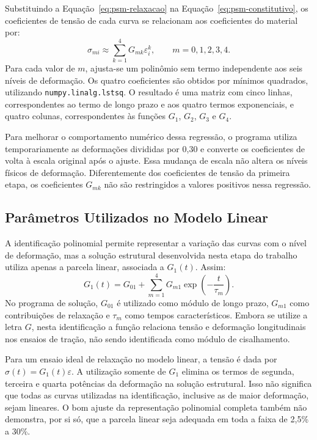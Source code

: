 \documentclass[arial,centeredequations,english,brazilian,oneside,section=TITLE]{ifes8}
\begin{document}
Substituindo a Equação~\eqref{eq:psm-relaxacao} na
Equação~\eqref{eq:psm-constitutivo}, os coeficientes de tensão de cada curva se relacionam
aos coeficientes do material por:
\begin{equation}
  \label{eq:regressao-coeficientes-material}
  \sigma_{mi}\approx\sum_{k=1}^{4}G_{mk}\varepsilon_i^k,
  \qquad m=0,1,2,3,4.
\end{equation}
Para cada valor de $m$, ajusta-se um polinômio sem termo independente aos seis níveis de
deformação. Os quatro coeficientes são obtidos por mínimos quadrados, utilizando
\texttt{numpy.linalg.lstsq}. O resultado é uma matriz com cinco linhas, correspondentes
ao termo de longo prazo e aos quatro termos exponenciais, e quatro colunas, correspondentes
às funções $G_1$, $G_2$, $G_3$ e $G_4$.

Para melhorar o comportamento numérico dessa regressão, o programa utiliza temporariamente
as deformações divididas por 0,30 e converte os coeficientes de volta à escala original após
o ajuste. Essa mudança de escala não altera os níveis físicos de deformação. Diferentemente
dos coeficientes de tensão da primeira etapa, os coeficientes $G_{mk}$ não são restringidos
a valores positivos nessa regressão.

\subsection{Parâmetros Utilizados no Modelo Linear}
\label{sec:parametros-material-linear}

A identificação polinomial permite representar a variação das curvas com o nível de
deformação, mas a solução estrutural desenvolvida nesta etapa do trabalho utiliza apenas
a parcela linear, associada a $G_1(t)$. Assim:
\begin{equation}
  \label{eq:relaxacao-material-linear}
  G_1(t)=G_{01}
  +\sum_{m=1}^{4}G_{m1}\exp\left(-\frac{t}{\tau_m}\right).
\end{equation}
No programa de solução, $G_{01}$ é utilizado como módulo de longo prazo, $G_{m1}$ como
contribuições de relaxação e $\tau_m$ como tempos característicos. Embora se utilize a letra
$G$, nesta identificação a função relaciona tensão e deformação longitudinais nos ensaios
de tração, não sendo identificada como módulo de cisalhamento.

Para um ensaio ideal de relaxação no modelo linear, a tensão é dada por
$\sigma(t)=G_1(t)\varepsilon$. A utilização somente de $G_1$ elimina os termos de segunda,
terceira e quarta potências da deformação na solução estrutural. Isso não significa que
todas as curvas utilizadas na identificação, inclusive as de maior deformação, sejam
lineares. O bom ajuste da representação polinomial completa também não demonstra, por
si só, que a parcela linear seja adequada em toda a faixa de 2,5\% a 30\%.
\end{document}
